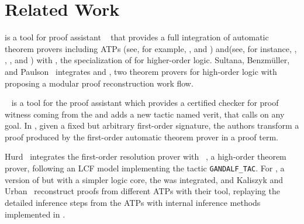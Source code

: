 \documentclass[main.tex]{subfiles}
\begin{document}

\section{Related Work}
\label{sec:related-work}

 is a tool for  proof assistant
~\cite{paulson1994isabelle} that provides a full integration of automatic
theorem provers including ATPs
(see, for example, \cite{meng2006automation}, \cite{blanchette2013extending}
and \cite{Fleury2014}) and\SMTsolvers (see, for instance,
\cite{hurlin07practical}, \cite{bohme2010},
\cite{blanchette2013extending}, and \cite{Fleury2014}) with
 \cite{nipkow2002isabelle}, the specialization of
 for higher-order logic. Sultana, Benzm{\"{u}}ller, and
Paulson~\cite{Een2004} integrates  and , two
theorem provers for high-order logic with  proposing a
modular proof reconstruction work flow.

~\cite{armand2011,Ekici2017} is a tool for the 
proof assistant \cite{coqteam} which provides a certified checker for
proof witness coming from the\SMTsolver {} \cite{bouton2009}
and adds a new tactic named verit, that calls  on any
 goal. In \cite{bezem2002automated}, given a fixed but arbitrary
first-order signature, the authors transform a proof produced by the
first-order automatic theorem prover  \cite{deNivelle2003}
in a  proof term.

Hurd~\cite{Hurd1999} integrates the first-order resolution prover
 with ~\cite{norrish2007hol}, a high-order theorem
prover, following an LCF model implementing the tactic \verb!GANDALF_TAC!.
For , a version of  but with a simpler logic core,
the\SMTsolver {} was integrated, and Kaliszyk and
Urban~\cite{kaliszyk2013} reconstruct proofs from different ATPs with their
 tool, replaying the detailed inference steps from the ATPs with
internal inference methods implemented in .



\end{document}
